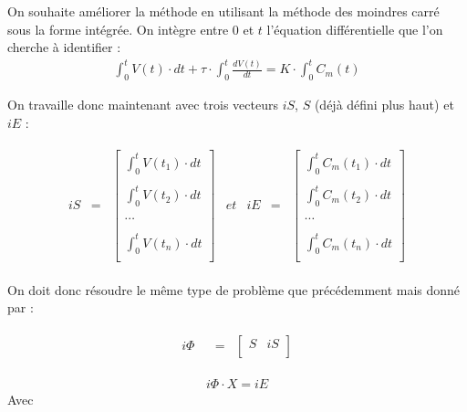 \begin{prop}
On souhaite améliorer la méthode en utilisant la méthode des moindres carré sous la forme intégrée.
On intègre entre $0$ et $t$ l'équation différentielle que l'on cherche à identifier : 
\begin{align*}
\int^t_0 V(t)\cdot dt+\tau\cdot \int^t_0\frac{d V(t)}{dt}=K\cdot \int^t_0 C_m(t)
\end{align*}

On travaille donc maintenant avec trois vecteurs $iS$, $S$ (déjà défini plus haut) et $iE$ : 

\begin{align*}
\begin{array}{ccccccc}
iS&=&
\left[
\begin{array}{c}
\int^t_0 V(t_1)\cdot dt\\
\\
\int^t_0 V(t_2)\cdot dt\\
\\
\cdots\\
\\
\int^t_0 V(t_n)\cdot dt\\
\end{array}
\right]
&et&iE&=&
\left[
\begin{array}{c}
\int^t_0 C_m(t_1)\cdot dt\\
\\
\int^t_0 C_m(t_2)\cdot dt\\
\\
\cdots\\
\\
\int^t_0 C_m(t_n)\cdot dt\\
\end{array}
\right]
\end{array}
\end{align*}

On doit donc résoudre le même type de problème que précédemment mais donné par : 

\begin{align*}
\begin{array}{ccccc}
i\Phi&
&=&
\left[
\begin{array}{cc}
S & iS\\
\end{array}
\right]
\end{array}
\end{align*}



\begin{align*}
i\Phi\cdot X=iE
\end{align*}
Avec 


\end{prop}
